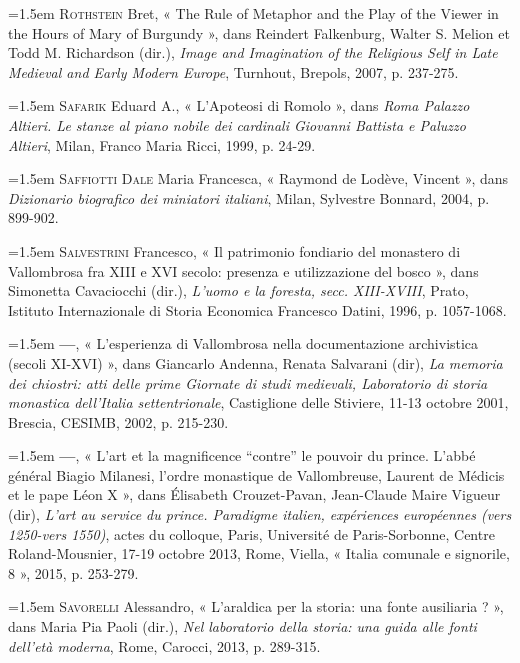 \documentclass[12pt,twoside,openany]{book}
\newenvironment{PurhBibliography}
  {%
    \par
    \setlength{\parindent}{0pt}%
    \setlength{\leftskip}{0pt}%
  }
  {%
    \par
  }
\begin{document}
\begin{PurhBibliography}
\noindent\hangindent=1.5em \textsc{Rothstein} Bret, « The Rule of Metaphor and the Play of the Viewer in the Hours of Mary of Burgundy », dans Reindert Falkenburg, Walter S. Melion et Todd M. Richardson (dir.), \textit{Image and Imagination of the Religious Self in Late Medieval and Early Modern Europe}, Turnhout, Brepols, 2007, p. 237-275.\par
\noindent\hangindent=1.5em \textsc{Safarik} Eduard A., « L’Apoteosi di Romolo », dans \textit{Roma Palazzo Altieri. Le stanze al piano nobile dei cardinali Giovanni Battista e Paluzzo Altieri}, Milan, Franco Maria Ricci, 1999, p. 24-29. \par
\noindent\hangindent=1.5em \textsc{Saffiotti Dale} Maria Francesca, « Raymond de Lodève, Vincent », dans \textit{Dizionario biografico dei miniatori italiani}, Milan, Sylvestre Bonnard, 2004, p. 899-902.\par
\noindent\hangindent=1.5em \textsc{Salvestrini} Francesco, « Il patrimonio fondiario del monastero di Vallombrosa fra \textsc{XIII} e \textsc{XVI} secolo: presenza e utilizzazione del bosco », dans Simonetta Cavaciocchi (dir.), \textit{L’uomo e la foresta, secc. XIII-XVIII}, Prato, Istituto Internazionale di Storia Economica Francesco Datini, 1996, p. 1057-1068.\par
\noindent\hangindent=1.5em \textbf{—}, « L’esperienza di Vallombrosa nella documentazione archivistica (secoli \textsc{XI}-\textsc{XVI}) », dans Giancarlo Andenna, Renata Salvarani (dir), \textit{La memoria dei chiostri: atti delle prime Giornate di studi medievali, Laboratorio di storia monastica dell’Italia settentrionale}, Castiglione delle Stiviere, 11-13 octobre 2001, Brescia, \textsc{CESIMB}, 2002, p. 215-230.\par
\noindent\hangindent=1.5em \textbf{—}, « L’art et la magnificence “contre” le pouvoir du prince. L’abbé général Biagio Milanesi, l’ordre monastique de Vallombreuse, Laurent de Médicis et le pape Léon X », dans Élisabeth Crouzet-Pavan, Jean-Claude Maire Vigueur (dir), \textit{L’art au service du prince. Paradigme italien, expériences européennes (vers 1250-vers 1550)}, actes du colloque, Paris, Université de Paris-Sorbonne, Centre Roland-Mousnier, 17-19 octobre 2013, Rome, Viella, « Italia comunale e signorile, 8 », 2015, p. 253-279.\par
\noindent\hangindent=1.5em \textsc{Savorelli} Alessandro, « L’araldica per la storia: una fonte ausiliaria ? », dans Maria Pia Paoli (dir.), \textit{Nel laboratorio della storia: una guida alle fonti dell’età moderna}, Rome, Carocci, 2013, p. 289-315.\par

\end{PurhBibliography}
\end{document}
